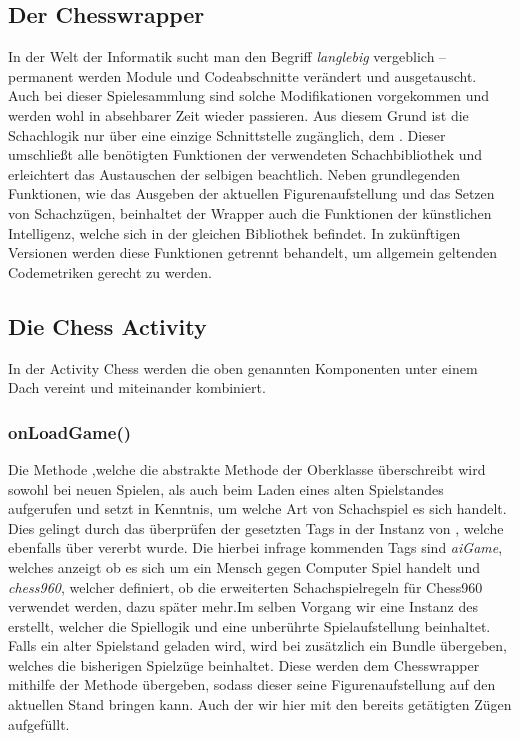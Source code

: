 \subsection{Der Chesswrapper}

In der Welt der Informatik sucht man den Begriff \emph{langlebig} vergeblich --
permanent werden Module und Codeabschnitte verändert und ausgetauscht. Auch bei
dieser Spielesammlung sind solche Modifikationen vorgekommen und werden wohl in
absehbarer Zeit wieder passieren. Aus diesem Grund ist die Schachlogik nur über
eine einzige Schnittstelle zugänglich, dem . Dieser
umschließt alle benötigten Funktionen der verwendeten Schachbibliothek und
erleichtert das Austauschen der selbigen beachtlich. Neben grundlegenden
Funktionen, wie das Ausgeben der aktuellen Figurenaufstellung und das Setzen
von Schachzügen, beinhaltet der Wrapper auch die Funktionen der künstlichen
Intelligenz, welche sich in der gleichen Bibliothek befindet. In zukünftigen
Versionen werden diese Funktionen getrennt behandelt, um allgemein geltenden
Codemetriken gerecht zu werden. 

\subsection{Die Chess Activity}

In der Activity Chess werden die oben genannten Komponenten unter einem Dach 
vereint und miteinander kombiniert.

\subsubsection{onLoadGame()}

Die Methode ,welche die abstrakte Methode der Oberklasse
 überschreibt wird sowohl bei neuen Spielen, als auch beim
Laden eines alten Spielstandes aufgerufen und setzt in Kenntnis, um welche Art
von Schachspiel es sich handelt. Dies gelingt durch das überprüfen der gesetzten
Tags in der Instanz von , welche ebenfalls über 
vererbt wurde. Die hierbei infrage kommenden Tags sind \emph{aiGame}, welches
anzeigt ob es sich um ein Mensch gegen Computer Spiel handelt und
\emph{chess960}, welcher definiert, ob die erweiterten Schachspielregeln für
Chess960 verwendet werden, dazu später mehr.\newline Im selben Vorgang wir eine
Instanz des  erstellt, welcher die Spiellogik und eine
unberührte Spielaufstellung beinhaltet. Falls ein alter Spielstand geladen wird,
wird bei  zusätzlich ein Bundle übergeben, welches die
bisherigen Spielzüge beinhaltet. Diese werden dem Chesswrapper mithilfe der
Methode  übergeben, sodass dieser seine Figurenaufstellung auf
den aktuellen Stand bringen kann. Auch der  wir hier
mit den bereits getätigten Zügen aufgefüllt.

